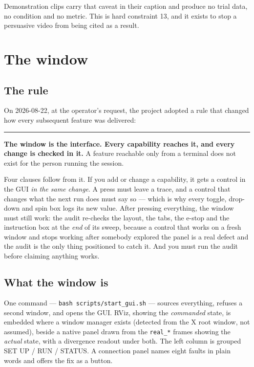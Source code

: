 \documentclass[11pt,a4paper,oneside]{report}
\newcommand{\code}[1]{\texttt{\small #1}}
\newcommand{\keyfact}[1]{%
  \par\vspace{7pt}\noindent
  \hspace*{0pt}\textcolor{srlblue}{\rule{2.5pt}{\dimexpr\baselineskip\relax}}%
  \hspace{9pt}%
  \begin{minipage}[t]{\dimexpr\textwidth-14pt\relax}
  \small #1
  \end{minipage}\par\vspace{7pt}}
\begin{document}
Demonstration clips carry that caveat in their caption and produce no trial
data, no condition and no metric. This is hard constraint 13, and it exists to
stop a persuasive video from being cited as a result.

\chapter{The window}

\section{The rule}

On 2026-08-22, at the operator's request, the project adopted a rule that
changed how every subsequent feature was delivered:

\keyfact{\textbf{The window is the interface. Every capability reaches it, and
every change is checked in it.} A feature reachable only from a terminal does
not exist for the person running the session.}

Four clauses follow from it. If you add or change a capability, it gets a
control in the GUI \emph{in the same change}. A press must leave a trace, and a
control that changes what the next run does must say so --- which is why every
toggle, drop-down and spin box logs its new value. After pressing everything,
the window must still work: the audit re-checks the layout, the tabs, the
e-stop and the instruction box at the \emph{end} of its sweep, because a
control that works on a fresh window and stops working after somebody explored
the panel is a real defect and the audit is the only thing positioned to catch
it. And you must run the audit before claiming anything works.

\section{What the window is}

One command --- \code{bash scripts/start\_gui.sh} --- sources everything,
refuses a second window, and opens the GUI. RViz, showing the \emph{commanded}
state, is embedded where a window manager exists (detected from the X root
window, not assumed), beside a native panel drawn from the \code{real\_*}
frames showing the \emph{actual} state, with a divergence readout under both.
The left column is grouped SET UP / RUN / STATUS. A connection panel names
eight faults in plain words and offers the fix as a button.
\end{document}
